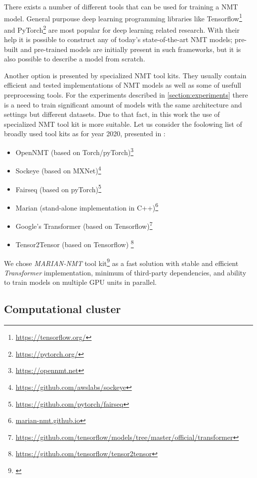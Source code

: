 There exists a number of different tools that can be used for training a NMT model.
General purpouse deep learning programming libraries like
Tensorflow\footnote{\url{https://tensorflow.org/}} and
PyTorch\footnote{\url{https://pytorch.org/}} are most popular for deep learning related
research. With their help it is possible to construct any of today's state-of-the-art
NMT models; pre-built and pre-trained models are initially present in such frameworks,
but it is also possible to describe a model from scratch.

Another option is presented by specialized NMT tool kits.
They usually contain efficient and tested implementations of NMT models as well as some of
usefull preprocessing tools.
For the experiments described in \ref{section:experiments} there is a need to train significant
amount of models with the same architecture and settings but different datasets.
Due to that fact, in this work the use of specialized NMT tool kit is more suitable.
Let us consider the foolowing list of broadly used tool kits as for year 2020,
presented in \cite{koehn_2020}:

\begin{itemize}
  \item OpenNMT (based on Torch/pyTorch)\footnote{\url{https://opennmt.net}}
  \item Sockeye (based on MXNet)\footnote{\url{https://github.com/awslabs/sockeye}}
  \item Fairseq (based on pyTorch)\footnote{\url{https://github.com/pytorch/fairseq}}
  \item Marian (stand-alone implementation in C++)\footnote{\url{marian-nmt.github.io}}
  \item Google's Transformer (based on Tensorflow)\footnote{\url{
    https://github.com/tensorflow/models/tree/master/official/transformer}}
  \item Tensor2Tensor (based on Tensorflow) \footnote{\url{
    https://github.com/tensorflow/tensor2tensor}}
\end{itemize}

We chose \textit{MARIAN-NMT} tool kit\footnote{\cite{mariannmt}} as a fast solution
with stable and efficient \textit{Transformer} \cite{vaswani-2017-transformer} implementation,
minimum of third-party dependencies, and ability to train models on multiple GPU units in parallel.


\subsection{Computational cluster}

